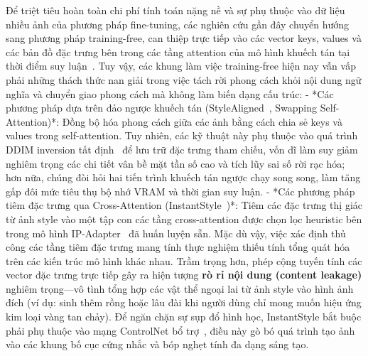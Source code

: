\documentclass[runningheads]{llncs}
\begin{document}
Để triệt tiêu hoàn toàn chi phí tính toán nặng nề và sự phụ thuộc vào dữ liệu nhiều ảnh của phương pháp fine-tuning, các nghiên cứu gần đây chuyển hướng sang phương pháp training-free, can thiệp trực tiếp vào các vector keys, values và các bản đồ đặc trưng bên trong các tầng attention của mô hình khuếch tán tại thời điểm suy luận~\cite{stylealigned,instantstyle,styleid,diffstyler,freestyle}. Tuy vậy, các khung làm việc training-free hiện nay vẫn vấp phải những thách thức nan giải trong việc tách rời phong cách khỏi nội dung ngữ nghĩa và chuyển giao phong cách mà không làm biến dạng cấu trúc:
- *Các phương pháp dựa trên đảo ngược khuếch tán (StyleAligned~\cite{stylealigned}, Swapping Self-Attention)*: Đồng bộ hóa phong cách giữa các ảnh bằng cách chia sẻ keys và values trong self-attention. Tuy nhiên, các kỹ thuật này phụ thuộc vào quá trình DDIM inversion tất định~\cite{DDIM} để lưu trữ đặc trưng tham chiếu, vốn dĩ làm suy giảm nghiêm trọng các chi tiết vân bề mặt tần số cao và tích lũy sai số rời rạc hóa; hơn nữa, chúng đòi hỏi hai tiến trình khuếch tán ngược chạy song song, làm tăng gấp đôi mức tiêu thụ bộ nhớ VRAM và thời gian suy luận.
- *Các phương pháp tiêm đặc trưng qua Cross-Attention (InstantStyle~\cite{instantstyle})*: Tiêm các đặc trưng thị giác từ ảnh style vào một tập con các tầng cross-attention được chọn lọc heuristic bên trong mô hình IP-Adapter~\cite{ipadapter} đã huấn luyện sẵn. Mặc dù vậy, việc xác định thủ công các tầng tiêm đặc trưng mang tính thực nghiệm thiếu tính tổng quát hóa trên các kiến trúc mô hình khác nhau. Trầm trọng hơn, phép cộng tuyến tính các vector đặc trưng trực tiếp gây ra hiện tượng \textbf{rò rỉ nội dung (content leakage)} nghiêm trọng---vô tình tổng hợp các vật thể ngoại lai từ ảnh style vào hình ảnh đích (ví dụ: sinh thêm rồng hoặc lâu đài khi người dùng chỉ mong muốn hiệu ứng kim loại vàng tan chảy). Để ngăn chặn sự sụp đổ hình học, InstantStyle bắt buộc phải phụ thuộc vào mạng ControlNet bổ trợ~\cite{controlNet}, điều này gò bó quá trình tạo ảnh vào các khung bố cục cứng nhắc và bóp nghẹt tính đa dạng sáng tạo.
\end{document}
